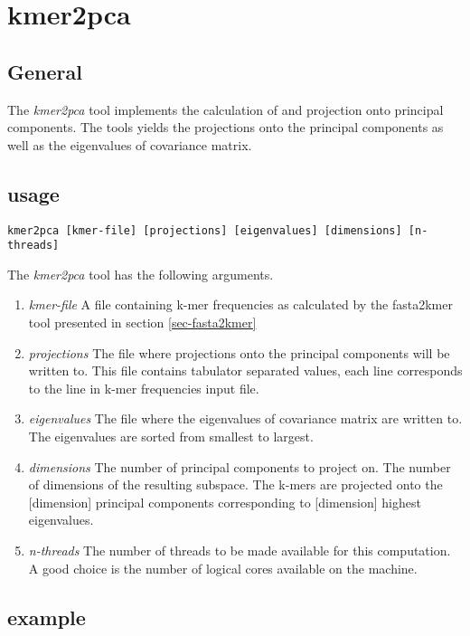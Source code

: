 \section{kmer2pca} \label{sec-kmer2pca}

\subsection{General}

The \emph{kmer2pca} tool implements the calculation of and projection onto
principal components. The tools yields the projections onto the
principal components as well as the eigenvalues of covariance matrix.

\subsection{usage}

\begin{lstlisting}
kmer2pca [kmer-file] [projections] [eigenvalues] [dimensions] [n-threads]
\end{lstlisting}
The \emph{kmer2pca} tool has the following arguments.
\begin{enumerate}
  \item \emph{kmer-file} A file containing k-mer frequencies as
    calculated by the fasta2kmer tool presented in section
    \ref{sec-fasta2kmer}
  \item \emph{projections} The file where projections onto the
    principal components will be written to. This file contains
    tabulator separated values, each line corresponds to the line in
    k-mer frequencies input file.
  \item \emph{eigenvalues} The file where the eigenvalues of
    covariance matrix are written to. The eigenvalues are sorted from
    smallest to largest.
  \item \emph{dimensions} The number of principal components to
    project on. The number of dimensions of the resulting
    subspace. The k-mers are projected onto the [dimension]
    principal components corresponding to [dimension] highest
    eigenvalues.
  \item \emph{n-threads} The number of threads to be made available
    for this computation. A good choice is the number of logical cores
    available on the machine.
\end{enumerate}

\subsection{example}

